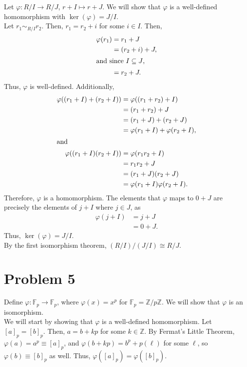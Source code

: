 \documentclass[10pt]{extarticle}
\newcommand{\Z}{\mathbb{Z}}
\begin{document}
  Let $\varphi: R/I \rightarrow R/J$, $r+I \mapsto r+J$. We will show that $\varphi$ is a well-defined homomorphism with $\ker(\varphi) = J/I$.\\

  Let $r_1 \sim_{R/I} r_2$. Then, $r_1 = r_2 + i$ for some $i\in I$. Then, 
  \begin{align*}
    \varphi(r_1) &= r_1 + J\\
                 &= (r_2 + i) + J,\\
                 \intertext{and since $I\subseteq J$,}
                 &= r_2 + J.
  \end{align*}
  Thus, $\varphi$ is well-defined. Additionally,
  \begin{align*}
    \varphi((r_1 + I) + (r_2 + I)) &= \varphi((r_1 + r_2) + I)\\
                                   &= (r_1 + r_2) + J\\
                                   &= (r_1 + J) + (r_2 + J)\\
                                   &= \varphi(r_1 + I) + \varphi(r_2 + I),\\
                                   \intertext{and}
    \varphi((r_1 + I)(r_2 + I)) &= \varphi(r_1r_2 + I)\\
                                &= r_1r_2 + J\\
                                &= (r_1 + J)(r_2 + J)\\
                                &= \varphi(r_1 + I)  \varphi(r_2 + I).
  \end{align*}
  Therefore, $\varphi$ is a homomorphism. The elements that $\varphi$ maps to $0 + J$ are precisely the elements of $j + I$ where $j\in J$, as
  \begin{align*}
    \varphi(j + I) &= j + J\\
                   &= 0 + J.
  \end{align*}
  Thus, $\ker(\varphi) = J/I$.\\

  By the first isomorphism theorem, $(R/I)/(J/I) \cong R/J$.
  \section{Problem 5}%
  Define $\varphi: \mathbb{F}_p \rightarrow \mathbb{F}_p$, where $\varphi(x) = x^p$ for $\mathbb{F}_p = \Z/p\Z$. We will show that $\varphi$ is an isomorphism.\\

  We will start by showing that $\varphi$ is a well-defined homomorphism. Let $[a]_{p} = [b]_p$. Then, $a = b + kp$ for some $k\in \Z$. By Fermat's Little Theorem, $\varphi(a) = a^{p} \equiv [a]_{p}$, and $\varphi(b + kp) = b^p + p(\ell)$ for some $\ell$, so $\varphi(b) \equiv [b]_{p}$ as well. Thus, $\varphi([a]_p) = \varphi([b]_p)$.\\
\end{document}
